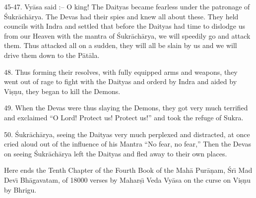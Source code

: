 45-47. Vy\=asa said :-- O king! The Daityas became fearless under the patronage of \'Sukr\=ach\=arya. The Devas had their spies and knew all about these. They held councils with Indra and settled that before the Daityas had time to dislodge us from our Heaven with the mantra of \'Sukr\=ach\=arya, we will speedily go and attack them. Thus attacked all on a sudden, they will all be slain by us and we will drive them down to the P\=at\=ala.

48. Thus forming their resolves, with fully equipped arms and weapons, they went out of rage to fight with the Daityas and orderd by Indra and aided by Vi\d{s}\d{n}u, they began to kill the Demons.

49. When the Devas were thus slaying the Demons, they got very much terrified and exclaimed ``O Lord! Protect us! Protect us!'' and took the refuge of Sukra.

50. \'Sukr\=ach\=arya, seeing the Daityas very much perplexed and distracted, at once cried aloud out of the influence of his Mantra ``No fear, no fear,'' Then the Devas on seeing \'Sukr\=ach\=arya left the Daityas and fled away to their own places.

Here ends the Tenth Chapter of the Fourth Book of the Mah\=a Pur\=a\d{n}am, \'Sr\={\i} Mad Dev\={\i} Bh\=agavatam, of 18000 verses by Mahar\d{s}\={\i} Veda Vy\=asa on the curse on Vi\d{s}\d{n}u by Bhrigu.



